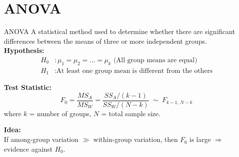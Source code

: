 \documentclass[aspectratio=169]{beamer}
\begin{document}
\section{ANOVA}

\begin{frame}{ANOVA}
A statistical method used to determine whether there are significant differences between the means of three or more independent groups. \\
\vspace{8pt}
\textbf{Hypothesis:}
\[
\begin{aligned}
H_0 &: \mu_1 = \mu_2 = \dots = \mu_k \text{ \ (All group means are equal)} \\
H_1 &: \text{At least one group mean is different from the others}
\end{aligned}
\]
\vspace{4pt}

\textbf{Test Statistic:}
\[
F_0 = \frac{MS_A}{MS_W} = \frac{SS_A / (k-1)}{SS_W / (N-k)} \;\sim\; F_{k-1,\, N-k}
\]
where $k$ = number of groups, $N$ = total sample size.\\
\vspace{6pt}

\textbf{Idea:}\\
If among-group variation $\gg$ within-group variation, then $F_0$ is large
$\Rightarrow$ evidence against $H_0$.
\end{frame}
\end{document}
